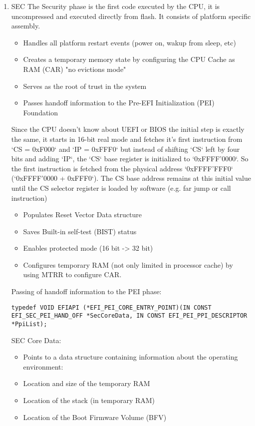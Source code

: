 \begin{enumerate}
    \item{\acf{SEC}}
    The Security phase is the first code executed by the CPU, it is uncompressed and executed directly from flash. It consists of platform specific assembly.

    \begin{itemize}
        \item  Handles all platform restart events (power on, wakup from sleep, etc)
        \item  Creates a temporary memory state by configuring the CPU Cache as RAM (CAR) "no evictions mode"
        \item  Serves as the root of trust in the system
        \item  Passes handoff information to the Pre-EFI Initialization (PEI) Foundation
    \end{itemize}


    Since the CPU doesn't know about UEFI or BIOS the initial step is exactly the same, it starts in 16-bit real mode and fetches it's first instruction from `CS = 0xF000` and `IP = 0xFFF0` but instead of shifting `CS` left by four bits and adding `IP`, the `CS` base register is initialized to `0xFFFF'0000`. So the first instruction is fetched from the physical address `0xFFFF'FFF0` (`0xFFFF'0000 + 0xFFF0`). The CS base address remains at this initial value until the CS selector register is loaded by software (e.g. far jump or call instruction)

    \begin{itemize}
        \item Populates Reset Vector Data structure
        \item Saves Built-in self-test (BIST) status
        \item Enables protected mode (16 bit -> 32 bit)
        \item Configures temporary RAM (not only limited in processor cache) by using MTRR to configure CAR.
    \end{itemize}

    Passing of handoff information to the PEI phase:

    \lstinline{typedef VOID EFIAPI (*EFI_PEI_CORE_ENTRY_POINT)(IN CONST EFI_SEC_PEI_HAND_OFF *SecCoreData, IN CONST EFI_PEI_PPI_DESCRIPTOR *PpiList);}

    SEC Core Data:
    \begin{itemize}
        \item Points to a data structure containing information about the operating environment:
        \item Location and size of the temporary RAM
        \item Location of the stack (in temporary RAM)
        \item Location of the Boot Firmware Volume (BFV)
    \end{itemize}



\end{enumerate}
